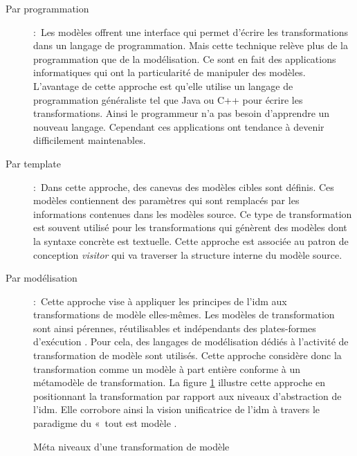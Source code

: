 \begin{description}

\item[Par programmation]:~Les modèles offrent une interface qui permet d'écrire les transformations dans 
un langage de programmation. Mais cette technique relève plus de la 
programmation que de la modélisation. Ce sont en fait des applications 
informatiques qui ont la particularité de manipuler des modèles. L'avantage de 
cette approche est qu'elle utilise un langage de programmation généraliste tel 
que Java ou C++ pour écrire les transformations. Ainsi le programmeur n'a pas 
besoin d'apprendre un nouveau langage. Cependant ces applications ont tendance à 
devenir difficilement maintenables.

\item [Par template]:~Dans cette approche, des canevas des modèles cibles sont définis. Ces modèles contiennent des paramètres qui sont remplacés par les informations contenues 
dans les modèles source. Ce type de transformation est souvent utilisé pour les 
transformations qui génèrent des modèles dont la syntaxe concrète est textuelle.  Cette approche est associée au patron de conception \textit{visitor} qui va traverser la structure interne du modèle source. 

\item [Par modélisation]:~Cette approche vise à appliquer les principes de l'\gls{idm} aux transformations de modèle elles-mêmes. Les modèles de transformation sont ainsi pérennes, réutilisables et indépendants des plates-formes d'exécution  \cite{bezivin2006model}. Pour cela, des langages de modélisation dédiés à l'activité de transformation de modèle sont utilisés. Cette approche considère donc la transformation comme 
un modèle à part entière conforme à un métamodèle de transformation. La figure 
\ref{fig:TransfoPrincipe} illustre cette approche en positionnant la transformation par rapport aux niveaux d'abstraction de l'\gls{idm}. Elle corrobore 
ainsi la vision unificatrice de l'\gls{idm} à travers le paradigme du «~tout est 
modèle \cite{bezivin2005unification}.
\end{description}


\begin{figure}[!ht]
 \begin{center}
  
 \end{center}
 \caption{Méta niveaux d'une transformation de modèle}
 \label{fig:TransfoPrincipe}
\end{figure}


